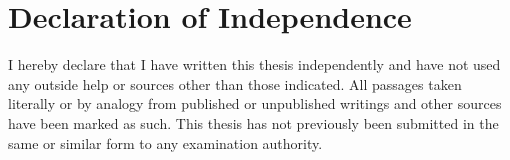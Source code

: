 \documentclass[12pt]{report}           %
\newcommand{\toponym}{Dortmund}                 %
\theoremstyle{thesis}        %
\begin{document}
	
	\vfill\newpage
	\chapter*{Declaration of Independence}
	\vspace{-1cm}
	\singlespacing
	\noindent
I hereby declare that I have written this thesis independently and have not used any outside help or sources other than those indicated. All passages taken literally or by analogy from published or unpublished writings and other sources have been marked as such. This thesis has not previously been submitted in the same or similar form to any examination authority.
\end{document}
